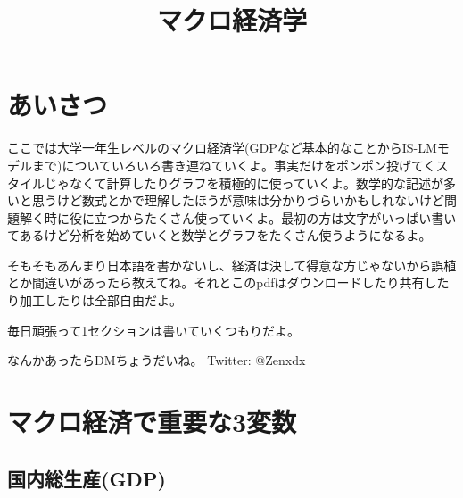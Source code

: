 \documentclass[a4paper, 12pt]{article}
\begin{document}
\setlength{\abovedisplayskip}{1pt}
\setlength{\belowdisplayskip}{1pt}

\onehalfspacing

\title{マクロ経済学}
\author{}
\date{}
\maketitle

\newpage

\tableofcontents

\newpage

\section{あいさつ}
ここでは大学一年生レベルのマクロ経済学(GDPなど基本的なことからIS-LMモデルまで)についていろいろ書き連ねていくよ。事実だけをポンポン投げてくスタイルじゃなくて計算したりグラフを積極的に使っていくよ。数学的な記述が多いと思うけど数式とかで理解したほうが意味は分かりづらいかもしれないけど問題解く時に役に立つからたくさん使っていくよ。最初の方は文字がいっぱい書いてあるけど分析を始めていくと数学とグラフをたくさん使うようになるよ。

そもそもあんまり日本語を書かないし、経済は決して得意な方じゃないから誤植とか間違いがあったら教えてね。それとこのpdfはダウンロードしたり共有したり加工したりは全部自由だよ。

毎日頑張って1セクションは書いていくつもりだよ。

なんかあったらDMちょうだいね。
Twitter: @Zenxdx

\newpage

\section{マクロ経済で重要な3変数}
\subsection{国内総生産(GDP)}
\end{document}
